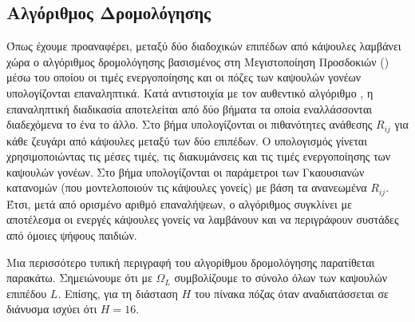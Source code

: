 \subsection{Αλγόριθμος Δρομολόγησης }

Όπως έχουμε προαναφέρει, μεταξύ δύο διαδοχικών επιπέδων από κάψουλες λαμβάνει χώρα ο αλγόριθμος δρομολόγησης βασισμένος στη Μεγιστοποίηση Προσδοκιών () μέσω του οποίου οι τιμές ενεργοποίησης και οι πόζες των καψουλών γονέων υπολογίζονται επαναληπτικά. Κατά αντιστοιχία με τον αυθεντικό αλγόριθμο , η επαναληπτική διαδικασία αποτελείται από δύο βήματα τα οποία εναλλάσσονται διαδεχόμενα το ένα το άλλο. Στο βήμα  υπολογίζονται οι πιθανότητες ανάθεσης $R_{ij}$ για κάθε ζευγάρι από κάψουλες μεταξύ των δύο επιπέδων. Ο υπολογισμός γίνεται χρησιμοποιώντας τις μέσες τιμές, τις διακυμάνσεις και τις τιμές ενεργοποίησης των καψουλών γονέων. Στο βήμα  υπολογίζονται οι παράμετροι των Γκαουσιανών κατανομών (που μοντελοποιούν τις κάψουλες γονείς) με βάση τα ανανεωμένα $R_{ij}$. Έτσι, μετά από ορισμένο αριθμό επαναλήψεων, ο αλγόριθμος συγκλίνει με αποτέλεσμα οι ενεργές κάψουλες γονείς να λαμβάνουν και να περιγράφουν συστάδες από όμοιες ψήφους παιδιών. \par

Μια περισσότερο τυπική περιγραφή του αλγορίθμου δρομολόγησης παρατίθεται παρακάτω. Σημειώνουμε ότι με $\Omega_L$ συμβολίζουμε το σύνολο όλων των καψουλών επιπέδου $L$. Επίσης, για τη διάσταση $H$ του πίνακα πόζας όταν αναδιατάσσεται σε διάνυσμα ισχύει ότι $Η = 16$.


